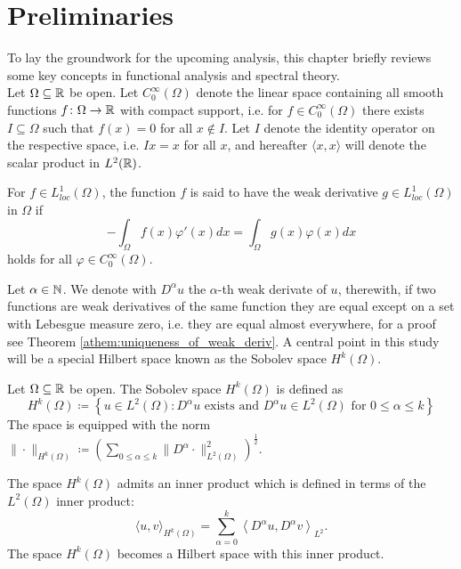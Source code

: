 \chapter{Preliminaries} \label{chap:2}

To lay the groundwork for the upcoming analysis, this chapter briefly reviews some key concepts in functional analysis and spectral theory.
~\\

Let $\Omega \subseteq \mathbb{R}$ be open. Let $C_{0}^{\infty}(\Omega)$ denote the linear space containing all smooth functions $f \colon \Omega \rightarrow \mathbb{R}$ with compact support, i.e. for $f \in C_{0}^{\infty}(\Omega)$ there exists $I \subseteq \Omega$ such that $f(x) = 0$ for all $x \notin I$. Let $I$ denote the identity operator on the respective space, i.e. $I x = x$ for all $x$, and hereafter $\langle x, x \rangle$ will denote the scalar product in $L^{2}(\mathbb{R})$.
\begin{definition}
For $f \in L^{1}_{loc}(\Omega)$, the function $f$ is said to have the weak derivative $g \in L^{1}_{loc}(\Omega)$ in $\Omega$ if
  \[ - \int_{\Omega} f(x) \varphi'(x) dx = \int_{\Omega} g(x) \varphi(x) dx \]
holds for all $\varphi \in C_{0}^{\infty}(\Omega)$.
\end{definition}
Let $\alpha \in \mathbb{N}$. We denote with $D^{\alpha} u$ the $\alpha$-th weak derivate of $u$, therewith, if two functions are weak derivatives of the same function they are equal except on a set with Lebesgue measure zero, i.e. they are equal almost everywhere, for a proof see Theorem \ref{athem:uniqueness_of_weak_deriv}. A central point in this study will be a special Hilbert space known as the Sobolev space $H^{k}(\Omega)$. 

\begin{definition} Let $\Omega \subseteq \mathbb{R}$ be open. The Sobolev space $H^{k}(\Omega)$ is defined as
\[ H^{k}(\Omega) \coloneqq \left\{ u \in L^{2}(\Omega) : D^{\alpha} u \text{ exists and } D^{\alpha} u \in L^{2}(\Omega) \text{ for } 0 \leq \alpha \leq k \right\} \]
The space is equipped with the norm $\| \cdot \|_{H^{k}(\Omega)} \coloneqq \left( \sum_{0 \leq \alpha \leq k} \| D^{\alpha} \cdot \|_{L^{2}(\Omega)}^{2} \right)^{\frac{1}{2}}$.
\end{definition}	

The space $H^{k}(\Omega)$ admits an inner product which is defined in terms of the $L^{2}(\Omega)$ inner product:
	\[  \langle u,v \rangle_{H^{k}(\Omega)} = \sum_{\alpha=0}^{k} \left\langle D^{\alpha} u, D^{\alpha} v \right \rangle_{L^2}. \]
The space $H^{k}(\Omega)$ becomes a Hilbert space with this inner product.


